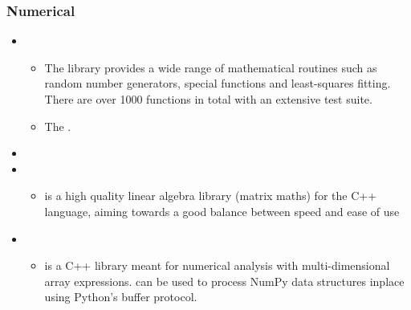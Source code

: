 \documentclass[letterpaper,10pt,english]{sphinxmanual}
\begin{document}
\subsubsection{Numerical}
\label{\detokenize{resource/programing/cpp_basic:numerical}}\begin{itemize}
\item {} 
\begin{itemize}
\item {} 
The library provides a wide range of mathematical routines such as
random number generators, special functions and least-squares
fitting. There are over 1000 functions in total with an extensive
test suite.

\item {} 
The .

\end{itemize}

\item {} 

\item {} 
\begin{itemize}
\item {} 
 is a high quality linear algebra library (matrix
maths) for the C++ language, aiming towards a good balance between
speed and ease of use

\end{itemize}

\item {} 
\begin{itemize}
\item {} 
 is a C++ library meant for numerical analysis with
multi-dimensional array expressions.  can be used to
process NumPy data structures inplace using Python’s buffer
protocol.

\end{itemize}

\end{itemize}
\end{document}

